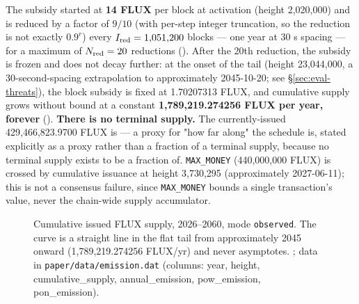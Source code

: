 The \PoN subsidy started at \textbf{14 FLUX} per block at activation (height 2,020,000) and is
reduced by a factor of $9/10$ (with per-step integer truncation, so the reduction is not exactly
$0.9^r$) every $I_{\mathrm{red}} = 1{,}051{,}200$ blocks — one year at 30 s spacing — for a maximum of
$N_{\mathrm{red}} = 20$ reductions (). After the
20th reduction, the subsidy is frozen and does not decay further: at the onset of the tail (height
23,044,000, a 30-second-spacing extrapolation to approximately 2045-10-20; see
\S\ref{sec:eval-threats}), the block subsidy is fixed at 1.70207313 FLUX, and cumulative supply
grows without bound at a constant \textbf{1,789,219.274256 FLUX per year, forever}
(). \textbf{There is no terminal supply.}
 The currently-issued 429,466,823.9700 FLUX is  — a proxy for "how far along" the schedule is, stated explicitly as a proxy
rather than a fraction of a terminal supply, because no terminal supply exists to be a fraction of.
\texttt{MAX\_MONEY} (440,000,000 FLUX) is crossed by cumulative issuance at height 3,730,295
(approximately 2027-06-11); this is not a consensus failure, since \texttt{MAX\_MONEY} bounds a
single transaction's value, never the chain-wide supply accumulator.

\begin{figure}[H]
\centering
{}
\caption{Cumulative issued FLUX supply, 2026--2060, mode \texttt{observed}. The curve is a
straight line in the flat tail from approximately 2045 onward (1,789,219.274256 FLUX/yr) and never
asymptotes. ; data in
\texttt{paper/\allowbreak{}data/\allowbreak{}emission.\allowbreak{}dat} (columns: year, height, cumulative\_supply, annual\_emission,
pow\_emission, pon\_emission).}
\label{fig:eval-supply}
\end{figure}

